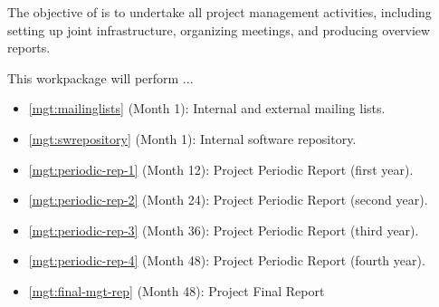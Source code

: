 \addtocounter{wpno}{1}

\begin{Workpackage}{\thewpno}
\WPTitle{\wpname{\thewpno}}

\begin{WPObjectives}
  The objective of \theWP{} is to undertake all project management
  activities, including setting up joint infrastructure, organizing
  meetings, and producing overview reports.
\end{WPObjectives}

\begin{WPDescription}
This workpackage will perform ...
\end{WPDescription}

\begin{WPDeliverables}
\begin{itemize}
\item
\ref{mgt:mailinglists}
(Month 1): 
Internal and external mailing lists.
\item
\ref{mgt:swrepository}
(Month 1): 
Internal software repository.
\item
\ref{mgt:periodic-rep-1}
(Month 12): 
Project Periodic Report (first year).
\item
\ref{mgt:periodic-rep-2}
 (Month 24): 
Project Periodic Report (second year).
\item
\ref{mgt:periodic-rep-3}
(Month 36): 
Project Periodic Report (third year).
\item
\ref{mgt:periodic-rep-4}
(Month 48): 
Project Periodic Report (fourth year).
\item
\ref{mgt:final-mgt-rep}
(Month 48): 
Project Final Report
\end{itemize}
\end{WPDeliverables}
\end{Workpackage}
